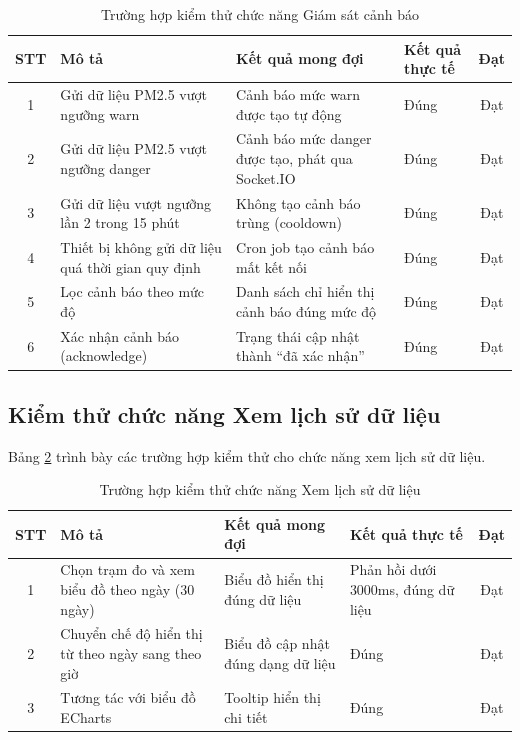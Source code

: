 \documentclass[../DoAn.tex]{subfiles}
\begin{document}
\begin{table}[H]
\centering
\caption{Trường hợp kiểm thử chức năng Giám sát cảnh báo}
\label{table:test_alert}
\small
\begin{tabularx}{\textwidth}{|c|X|X|X|c|}
\hline
\textbf{STT} & \textbf{Mô tả} & \textbf{Kết quả mong đợi} & \textbf{Kết quả thực tế} & \textbf{Đạt} \\
\hline
1 & Gửi dữ liệu PM2.5 vượt ngưỡng warn & Cảnh báo mức warn được tạo tự động & Đúng & Đạt \\
\hline
2 & Gửi dữ liệu PM2.5 vượt ngưỡng danger & Cảnh báo mức danger được tạo, phát qua Socket.IO & Đúng & Đạt \\
\hline
3 & Gửi dữ liệu vượt ngưỡng lần 2 trong 15 phút & Không tạo cảnh báo trùng (cooldown) & Đúng & Đạt \\
\hline
4 & Thiết bị không gửi dữ liệu quá thời gian quy định & Cron job tạo cảnh báo mất kết nối & Đúng & Đạt \\
\hline
5 & Lọc cảnh báo theo mức độ & Danh sách chỉ hiển thị cảnh báo đúng mức độ & Đúng & Đạt \\
\hline
6 & Xác nhận cảnh báo (acknowledge) & Trạng thái cập nhật thành ``đã xác nhận'' & Đúng & Đạt \\
\hline
\end{tabularx}
\end{table}

\subsection{Kiểm thử chức năng Xem lịch sử dữ liệu}
\label{subsection:4.4.4}

Bảng \ref{table:test_history} trình bày các trường hợp kiểm thử cho chức năng xem lịch sử dữ liệu.

\begin{table}[H]
\centering
\caption{Trường hợp kiểm thử chức năng Xem lịch sử dữ liệu}
\label{table:test_history}
\small
\begin{tabularx}{\textwidth}{|c|X|X|X|c|}
\hline
\textbf{STT} & \textbf{Mô tả} & \textbf{Kết quả mong đợi} & \textbf{Kết quả thực tế} & \textbf{Đạt} \\
\hline
1 & Chọn trạm đo và xem biểu đồ theo ngày (30 ngày) & Biểu đồ hiển thị đúng dữ liệu & Phản hồi dưới 3000ms, đúng dữ liệu & Đạt \\
\hline
2 & Chuyển chế độ hiển thị từ theo ngày sang theo giờ & Biểu đồ cập nhật đúng dạng dữ liệu & Đúng & Đạt \\
\hline
3 & Tương tác với biểu đồ ECharts & Tooltip hiển thị chi tiết & Đúng & Đạt \\
\hline
\end{tabularx}
\end{table}
\end{document}

